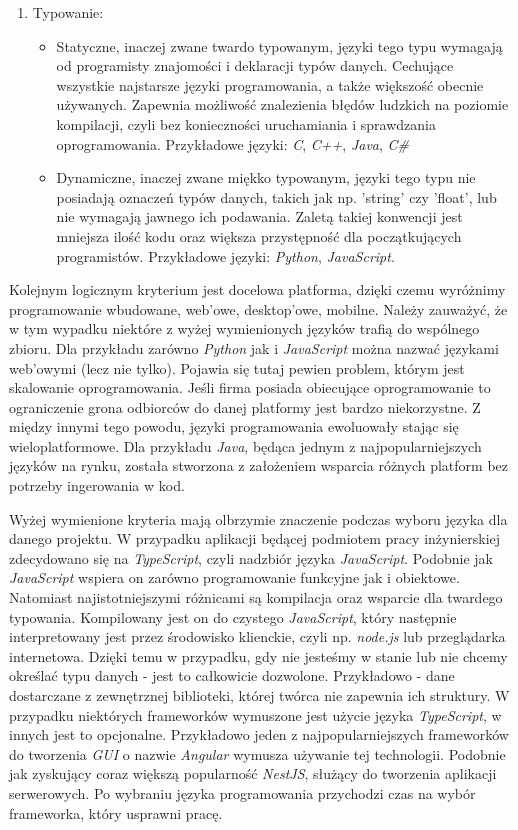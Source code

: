 \documentclass[skorowidz,skroty]{dyplomWEZUT}
\begin{document}
\begin{enumerate}
\item Typowanie:
\begin{itemize}
	\item Statyczne, inaczej zwane twardo typowanym, języki tego typu wymagają od programisty znajomości i deklaracji typów danych. Cechujące wszystkie najstarsze języki programowania, a także większość obecnie używanych. Zapewnia możliwość znalezienia błędów ludzkich na poziomie kompilacji, czyli bez konieczności uruchamiania i sprawdzania oprogramowania. Przykładowe języki: \textit{C}, \textit{C++}, \textit{Java}, \textit{C\#}
	 \item Dynamiczne, inaczej zwane miękko typowanym, języki tego typu nie posiadają oznaczeń typów danych, takich jak np. 'string' czy 'float', lub nie wymagają jawnego ich podawania. Zaletą takiej konwencji jest mniejsza ilość kodu oraz większa przystępność dla początkujących programistów. Przykładowe języki: \textit{Python}, \textit{JavaScript}. 

\end{itemize}

\end{enumerate} 
Kolejnym logicznym kryterium jest docelowa platforma, dzięki czemu wyróżnimy programowanie wbudowane, web'owe, desktop'owe, mobilne. Należy zauważyć, że w tym wypadku niektóre z wyżej wymienionych języków trafią do wspólnego zbioru. Dla przykładu zarówno \textit{Python} jak i \textit{JavaScript} można nazwać językami web'owymi (lecz nie tylko). Pojawia się tutaj pewien problem, którym jest skalowanie oprogramowania. Jeśli firma posiada obiecujące oprogramowanie to ograniczenie grona odbiorców do danej platformy jest bardzo niekorzystne. Z między innymi tego powodu, języki programowania ewoluowały stając się wieloplatformowe. Dla przykładu \textit{Java}, będąca jednym z najpopularniejszych języków na rynku, została stworzona z założeniem wsparcia różnych platform bez potrzeby ingerowania w kod. 

Wyżej wymienione kryteria mają olbrzymie znaczenie podczas wyboru języka dla danego projektu. W przypadku aplikacji będącej podmiotem pracy inżynierskiej zdecydowano się na \textit{TypeScript}, czyli nadzbiór języka \textit{JavaScript}. Podobnie jak \textit{JavaScript} wspiera on zarówno programowanie funkcyjne jak i obiektowe. Natomiast najistotniejszymi różnicami są kompilacja oraz wsparcie dla twardego typowania. Kompilowany jest on do czystego \textit{JavaScript}, który następnie interpretowany jest przez środowisko klienckie, czyli np. \textit{node.js} lub przeglądarka internetowa. Dzięki temu w przypadku, gdy nie jesteśmy w stanie lub nie chcemy określać typu danych - jest to całkowicie dozwolone. Przykładowo - dane dostarczane z zewnętrznej biblioteki, której twórca nie zapewnia ich struktury. W przypadku niektórych frameworków wymuszone jest użycie języka \textit{TypeScript}, w innych jest to opcjonalne. Przykładowo jeden z najpopularniejszych frameworków do tworzenia \textit{GUI} o nazwie \textit{Angular} wymusza używanie tej technologii. Podobnie jak zyskujący coraz większą popularność \textit{NestJS}, służący do tworzenia aplikacji serwerowych. Po wybraniu języka programowania przychodzi czas na wybór frameworka, który usprawni pracę.
\end{document}
